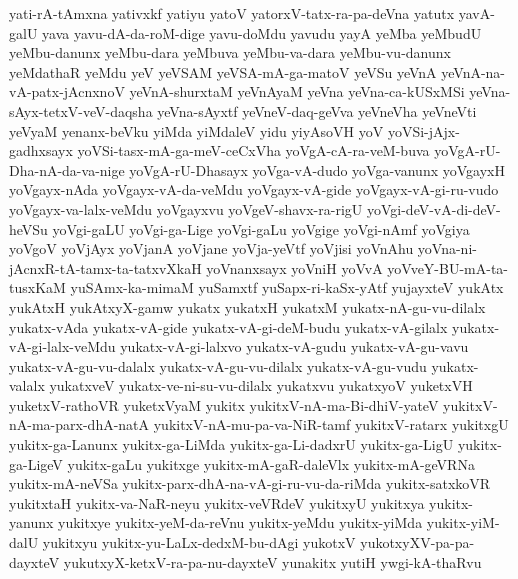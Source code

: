 {yati-rA-tAmxna
yativxkf
yatiyu
yatoV
yatorxV-tatx-ra-pa-deVna
yatutx
yavA-galU
yava
yavu-dA-da-roM-dige
yavu-doMdu
yavudu
yayA
yeMba
yeMbudU
yeMbu-danunx
yeMbu-dara
yeMbuva
yeMbu-va-dara
yeMbu-vu-danunx
yeMdathaR
yeMdu
yeV
yeVSAM
yeVSA-mA-ga-matoV
yeVSu
yeVnA
yeVnA-na-vA-patx-jAcnxnoV
yeVnA-shurxtaM
yeVnAyaM
yeVna
yeVna-ca-kUSxMSi
yeVna-sAyx-tetxV-veV-daqsha
yeVna-sAyxtf
yeVneV-daq-geVva
yeVneVha
yeVneVti
yeVyaM
yenanx-beVku
yiMda
yiMdaleV
yidu
yiyAsoVH
yoV
yoVSi-jAjx-gadhxsayx
yoVSi-tasx-mA-ga-meV-ceCxVha
yoVgA-cA-ra-veM-buva
yoVgA-rU-Dha-nA-da-va-nige
yoVgA-rU-Dhasayx
yoVga-vA-dudo
yoVga-vanunx
yoVgayxH
yoVgayx-nAda
yoVgayx-vA-da-veMdu
yoVgayx-vA-gide
yoVgayx-vA-gi-ru-vudo
yoVgayx-va-lalx-veMdu
yoVgayxvu
yoVgeV-shavx-ra-rigU
yoVgi-deV-vA-di-deV-heVSu
yoVgi-gaLU
yoVgi-ga-Lige
yoVgi-gaLu
yoVgige
yoVgi-nAmf
yoVgiya
yoVgoV
yoVjAyx
yoVjanA
yoVjane
yoVja-yeVtf
yoVjisi
yoVnAhu
yoVna-ni-jAcnxR-tA-tamx-ta-tatxvXkaH
yoVnanxsayx
yoVniH
yoVvA
yoVveY-BU-mA-ta-tusxKaM
yuSAmx-ka-mimaM
yuSamxtf
yuSapx-ri-kaSx-yAtf
yujayxteV
yukAtx
yukAtxH
yukAtxyX-gamw
yukatx
yukatxH
yukatxM
yukatx-nA-gu-vu-dilalx
yukatx-vAda
yukatx-vA-gide
yukatx-vA-gi-deM-budu
yukatx-vA-gilalx
yukatx-vA-gi-lalx-veMdu
yukatx-vA-gi-lalxvo
yukatx-vA-gudu
yukatx-vA-gu-vavu
yukatx-vA-gu-vu-dalalx
yukatx-vA-gu-vu-dilalx
yukatx-vA-gu-vudu
yukatx-valalx
yukatxveV
yukatx-ve-ni-su-vu-dilalx
yukatxvu
yukatxyoV
yuketxVH
yuketxV-rathoVR
yuketxVyaM
yukitx
yukitxV-nA-ma-Bi-dhiV-yateV
yukitxV-nA-ma-parx-dhA-natA
yukitxV-nA-mu-pa-va-NiR-tamf
yukitxV-ratarx
yukitxgU
yukitx-ga-Lanunx
yukitx-ga-LiMda
yukitx-ga-Li-dadxrU
yukitx-ga-LigU
yukitx-ga-LigeV
yukitx-gaLu
yukitxge
yukitx-mA-gaR-daleVlx
yukitx-mA-geVRNa
yukitx-mA-neVSa
yukitx-parx-dhA-na-vA-gi-ru-vu-da-riMda
yukitx-satxkoVR
yukitxtaH
yukitx-va-NaR-neyu
yukitx-veVRdeV
yukitxyU
yukitxya
yukitx-yanunx
yukitxye
yukitx-yeM-da-reVnu
yukitx-yeMdu
yukitx-yiMda
yukitx-yiM-dalU
yukitxyu
yukitx-yu-LaLx-dedxM-bu-dAgi
yukotxV
yukotxyXV-pa-pa-dayxteV
yukutxyX-ketxV-ra-pa-nu-dayxteV
yunakitx
yutiH
ywgi-kA-thaRvu
}
